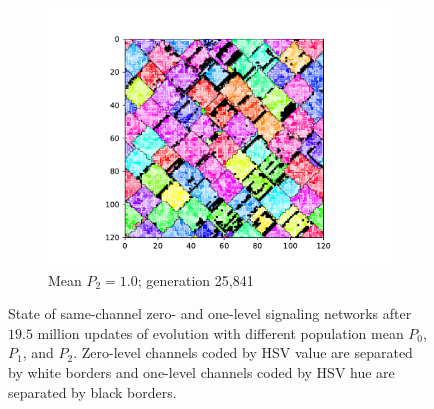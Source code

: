 \begin{figure}[t]
\begin{center}
\begin{subfigure}[b]{0.82\columnwidth}
  \includegraphics[width=\columnwidth,trim={2.5cm 0.5cm 2.5cm 1cm},clip]{img/ChannelMap_1008_update19500000}
  \caption{Mean $P_2 = 1.0$; generation 25,841}
  \label{fig:ChannelMap_1008}
\end{subfigure}

\caption{
State of same-channel zero- and one-level signaling networks after $19.5$ million updates of evolution with different population mean $P_0$, $P_1$, and $P_2$.
Zero-level channels coded by HSV value are separated by white borders and one-level channels coded by HSV hue are separated by black borders.
}
\label{fig:outcome_grids}
\end{center}
\end{figure}
